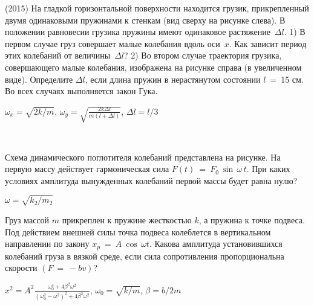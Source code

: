 \begin{ex}
(2015) На гладкой горизонтальной поверхности находится грузик, прикрепленный двумя одинаковыми пружинами к стенкам (вид сверху на рисунке слева). 
В положении равновесии грузика пружины имеют одинаковое растяжение~$\Delta l$. 1) В первом случае груз совершает малые колебания вдоль оси~$x$. 
Как зависит период этих колебаний от величины~$\Delta l$?   2) Во втором случае траектория грузика, совершающего малые колебания, изображена на рисунке справа (в увеличенном виде).
Определите $\Delta l$, если длина пружин в нерастянутом состоянии $l$~=~15 см. Во всех случаях выполняется закон Гука.
\begin{center}

\end{center}
\begin{ans}
$\omega_x = \sqrt{2k/m}$, $\omega_y=\sqrt{\frac{2k\Delta l}{m(l+\Delta l)}}$, $\Delta l = l/3$
\end{ans}
\end{ex}

\begin{ex}
\hspace{0pt} \\
\begin{minipage}{.65\textwidth}
Схема динамического поглотителя колебаний представлена на рисунке. На первую массу действует гармоническая сила $F(t)~=~F_0\,\sin\,\omega\,t$. 
При каких условиях амплитуда вынужденных колебаний первой массы будет равна нулю?
\end{minipage}
\begin{minipage}{.35\textwidth}
\centering

\end{minipage}
\begin{ans}
$\omega = \sqrt{k_2/m_2}$
\end{ans}
\end{ex}

\begin{ex}
Груз массой $m$ прикреплен к пружине жесткостью $k$, а пружина к точке подвеса. 
Под действием внешней силы точка подвеса колеблется в вертикальном направлении по закону $x_p~=~A~\cos\,\omega t$. 
Какова амплитуда установившихся колебаний груза в вязкой среде, если сила сопротивления пропорциональна скорости $(F~=~-bv)$?
\begin{ans}
$x^2 = A^2\frac{\omega_0^4+4\beta^2\omega^2}{(\omega_0^2-\omega^2)^2+4\beta^2\omega^2}$, $\omega_0 = \sqrt{k/m}$, $\beta = b/2m$
\end{ans}
\end{ex}

